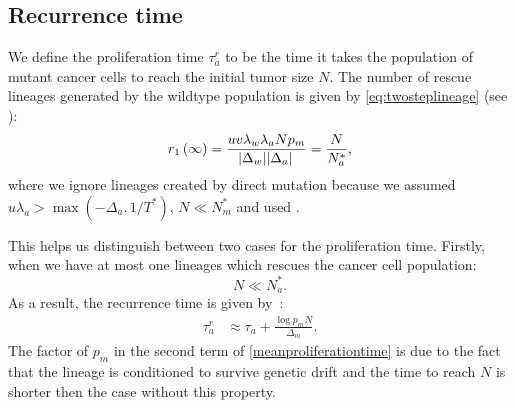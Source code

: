 \documentclass[12pt]{extarticle}
\begin{document}
\begin{appendices}
\section{Recurrence time}\label{sec:appendix_recurrence_time}
We define the proliferation time $\tau_a^r$  to be the time it takes the population of mutant cancer cells to reach the initial tumor size $N$. The number of rescue lineages generated by the wildtype population is given by  \cref{eq:twosteplineage} (see ):
\begin{equation*}
r_1\left(\infty\right)=\frac{uv\lambda_w\lambda_aNp_m}{\abs{\Delta_w}\abs{\Delta_a}}=\frac{N}{N_a^*},
\end{equation*}
where we ignore lineages created by direct mutation because we assumed $u\lambda_a > \max{(-\Delta_a, 1/T^*)}$, $N\ll N_m^*$ and used .

This helps us distinguish between two cases for the proliferation time. Firstly, when we have at most one lineages which rescues the cancer cell population:
\begin{equation*}
N\ll N_a^*.
\end{equation*}
As a result, the recurrence time is given by~\citep{avanzini2019cancer}:
\begin{align}\label{meanproliferationtime}
\tau_a^r&\approx\tau_a+\frac{\log p_mN}{\Delta_m}.
\end{align}
The factor of $p_m$ in the second term of \cref{meanproliferationtime} is due to the fact that the lineage is conditioned to survive genetic drift and the time to reach $N$ is shorter then the case without this property. 


\end{appendices}
\end{document}
